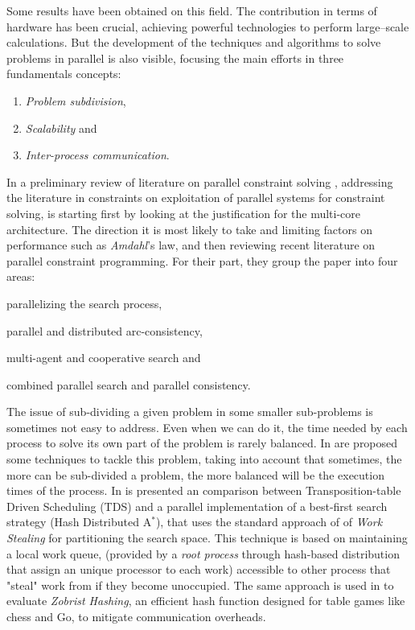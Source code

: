 Some results have been obtained on this field. The contribution in terms of hardware has been crucial, achieving powerful technologies to perform large--scale calculations. But the development of the techniques and algorithms to solve problems in parallel is also visible, focusing the main efforts in three fundamentals concepts: 
\begin{enumerate}%
    \item {\it Problem subdivision},
    \item {\it Scalability} and
    \item {\it Inter-process communication}.
\end{enumerate}%

In a preliminary review of literature on parallel constraint solving \cite{Gent}, addressing the literature in constraints on exploitation of parallel systems for constraint solving, is starting first by looking at the justification for the multi-core architecture. The direction it is most likely to take and limiting factors on performance such as \textit{Amdahl}'s law, and then reviewing recent literature on parallel constraint programming. For their part, they group the paper into four areas: 
\begin{inparaenum}[i)]
	\item parallelizing the search process,  
	\item parallel and distributed arc-consistency, 
	\item multi-agent and cooperative search and
	\item combined parallel search and parallel consistency.
\end{inparaenum}

The issue of sub-dividing a given problem in some smaller sub-problems is sometimes not easy to address. Even when we can do it, the time needed by each process to solve its own part of the problem is rarely balanced. In \cite{Rezgui2013} are proposed some techniques to tackle this problem, taking into account that sometimes, the more can be sub-divided a problem, the more balanced will be the execution times of the process. In \cite{Kishimoto2013} is presented an comparison between Transposition-table Driven Scheduling (TDS) and a parallel implementation of a best-first search strategy (Hash Distributed A$^*$), that uses the standard approach of of \textit{Work Stealing} for partitioning the search space. This technique is based on maintaining a local work queue, (provided by a \textit{root process} through hash-based distribution that assign an unique processor to each work) accessible to other process that "steal" work from if they become unoccupied. The same approach is used in \cite{Jinnai} to evaluate \textit{Zobrist Hashing}, an efficient hash function designed for table games like chess and Go, to mitigate communication overheads.

